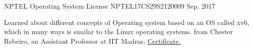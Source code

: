 

\begin{cventries}

  \cventry
    {NPTEL} %
    {Operating System} %
    {License NPTEL17CS29S2120009} %
    {Sep. 2017} %
    {
      \begin{cvitems} %
        \item {Learned about different concepts of Operating system based on an OS called xv6, which in many ways is similar to the Linux operating systems. from Chester Rebeiro, an Assistant Professor at IIT Madras. \href{https://goo.gl/sc4M6R}{Certificate.}}
      \end{cvitems}
    }

\end{cventries}
